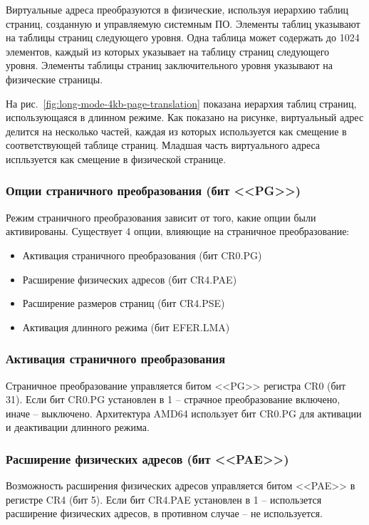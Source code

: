 Виртуальные адреса преобразуются в физические, используя иерархию таблиц страниц, созданную и управляемую системным ПО.
Элементы таблиц указывают на таблицы страниц следующего уровня. Одна таблица может содержать до 1024 элементов,
каждый из которых указывает на таблицу страниц следующего уровня. Элементы таблицы страниц заключительного уровня
указывают на физические страницы.

На рис.~\ref{fig:long-mode-4kb-page-translation} показана иерархия таблиц страниц, использующаяся в длинном режиме.
Как показано на рисунке, виртуальный адрес делится на несколько частей, каждая из которых используется как смещение
в соответствующей таблице страниц. Младшая часть виртуального адреса испльзуется как смещение в физической странице.

\subsubsection*{Опции страничного преобразования (бит <<PG>>)}
Режим страничного преобразования зависит от того, какие опции были активированы. Существует
4 опции, влияющие на страничное преобразование:
\begin{itemize}
	\item Активация страничного преобразования (бит CR0.PG)
	\item Расширение физических адресов (бит CR4.PAE)
	\item Расширение размеров страниц (бит CR4.PSE)
	\item Активация длинного режима (бит EFER.LMA)
\end{itemize}

\subsubsection*{Активация страничного преобразования}
Страничное преобразование управляется битом <<PG>> регистра CR0 (бит 31). Если бит CR0.PG установлен в 1 --
страчное преобразование включено, иначе -- выключено. Архитектура AMD64 использует бит CR0.PG для активации
и деактивации длинного режима.

\subsubsection*{Расширение физических адресов (бит <<PAE>>)}
Возможность расширения физических адресов управляется битом <<PAE>> в регистре CR4 (бит 5). Если бит CR4.PAE
установлен в 1 -- использется расширение физических адресов, в противном случае -- не используется.

